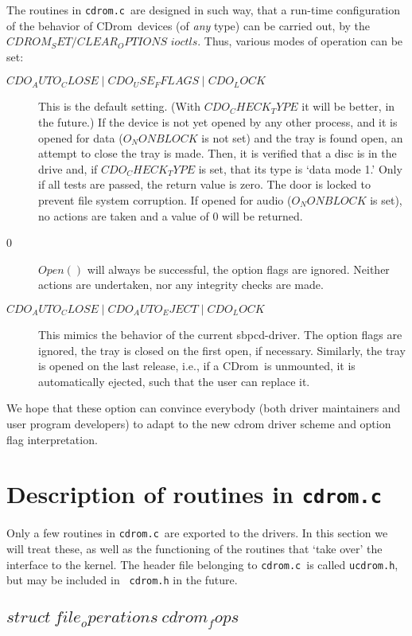 \documentclass{article}
\def\cdrom{{\sc CDrom}}
\def\cdromc{{\tt cdrom.c}}
\def\ucdrom{{\tt ucdrom.h}}
\begin{document}
The routines in \cdromc\ are designed in such way, that a run-time
configuration of the behavior of \cdrom\ devices (of {\em any\/} type)
can be carried out, by the $CDROM_SET/CLEAR_OPTIONS$ $ioctls$. Thus, various
modes of operation can be set:
\begin{description}
\item[$CDO_AUTO_CLOSE \mathrel| CDO_USE_FFLAGS \mathrel| CDO_LOCK$]
This is the default setting. (With $CDO_CHECK_TYPE$ it will be better,
in the future.) If the device is not yet opened by any other process,
and it is opened for data ($O_NONBLOCK$ is not set) and the tray is
found open, an attempt to close the tray is made. Then, it is verified
that a disc is in the drive and, if $CDO_CHECK_TYPE$ is set, that its
type is `data mode 1.' Only if all tests are passed, the return value
is zero. The door is locked to prevent file system corruption. If
opened for audio ($O_NONBLOCK$ is set), no actions are taken and a
value of 0 will be returned.
\item[0] $Open()$ will always be successful, the option flags are
ignored. Neither actions are undertaken, nor any integrity checks are
made. 
\item[$CDO_AUTO_CLOSE \mathrel| CDO_AUTO_EJECT \mathrel| CDO_LOCK$]
This mimics the behavior of the current sbpcd-driver. The option flags
are ignored, the tray is closed on the first open, if
necessary. Similarly, the tray is opened on the last release, i.e., if
a \cdrom\ is unmounted, it is automatically ejected, such that the
user can replace it. 
\end{description}
We hope that these option can convince everybody (both driver
maintainers and user program developers) to adapt to the new cdrom
driver scheme and option flag interpretation. 

\section{Description of routines in \cdromc}

Only a few routines in \cdromc\ are exported to the drivers. In this
section we will treat these, as well as the functioning of the routines
that `take over' the interface to the kernel. The header file
belonging to \cdromc\ is called \ucdrom, but may be included in {\tt
cdrom.h} in the future.

\subsection{$struct\ file_operations\ cdrom_fops$}
\end{document}
